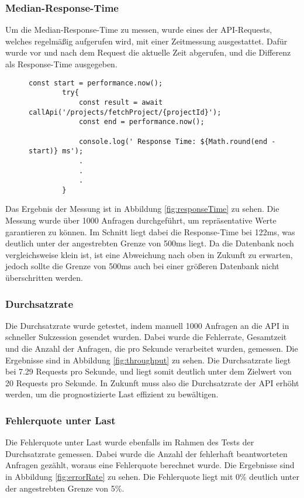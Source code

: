 \subsubsection{Median-Response-Time}
Um die Median-Response-Time zu messen, wurde eines der API-Requests, welches regelmäßig aufgerufen wird, mit einer Zeitmessung ausgestattet.
Dafür wurde vor und nach dem Request die aktuelle Zeit abgerufen, und die Differenz als Response-Time ausgegeben.
\begin{figure}[H]
    \begin{lstlisting}[caption=Median Response Time Testing, breaklines = true, label=list:responseTimeTest]
        const start = performance.now();
        try{
            const result = await callApi('/projects/fetchProject/{projectId}');
            const end = performance.now();

            console.log(' Response Time: ${Math.round(end - start)} ms');
            .
            .
            .
        }
    \end{lstlisting}
\end{figure}
Das Ergebnis der Messung ist in Abbildung \ref{fig:responseTime} zu sehen. Die Messung wurde über 1000 Anfragen durchgeführt, um repräsentative Werte 
garantieren zu können. Im Schnitt liegt dabei die Response-Time bei 122ms, was deutlich unter der angestrebten Grenze von 500ms liegt. Da die Datenbank noch 
vergleichsweise klein ist, ist eine Abweichung nach oben in Zukunft zu erwarten, jedoch sollte die Grenze von 500ms auch bei einer größeren Datenbank nicht überschritten werden.
\subsubsection{Durchsatzrate}
Die Durchsatzrate wurde getestet, indem manuell 1000 Anfragen an die API in schneller Sukzession gesendet wurden. Dabei wurde die Fehlerrate, Gesamtzeit und die Anzahl 
der Anfragen, die pro Sekunde verarbeitet wurden, gemessen. Die Ergebnisse sind in Abbildung \ref{fig:throughput} zu sehen. Die Durchsatzrate liegt bei 7.29 Requests pro Sekunde,
und liegt somit deutlich unter dem Zielwert von 20 Requests pro Sekunde. In Zukunft muss also die Durchsatzrate der API erhöht werden, um die prognostizierte Last effizient zu bewältigen.
\subsubsection{Fehlerquote unter Last}
Die Fehlerquote unter Last wurde ebenfalls im Rahmen des Tests der Durchsatzrate gemessen. Dabei wurde die Anzahl der fehlerhaft beantworteten Anfragen gezählt, woraus eine Fehlerquote 
berechnet wurde. Die Ergebnisse sind in Abbildung \ref{fig:errorRate} zu sehen. Die Fehlerquote liegt mit 0\% deutlich unter der angestrebten Grenze von 5\%.
